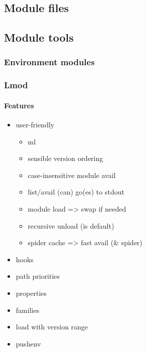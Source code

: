 \subsection{Module files}


\subsection{Module tools}

\subsubsection{Environment modules}


\subsubsection{Lmod}

\paragraph{Features}


\begin{itemize}
    \item user-friendly
    \begin{itemize}
        \item ml
        \item sensible version ordering
        \item case-insensitive module avail
        \item list/avail (can) go(es) to stdout
        \item module load => swap if needed
        \item recursive unload (is default)
        \item spider cache => fast avail (\& spider)
    \end{itemize}
    \item hooks
    \item path priorities
    \item properties
    \item families
    \item load with version range
    \item pushenv
\end{itemize}

